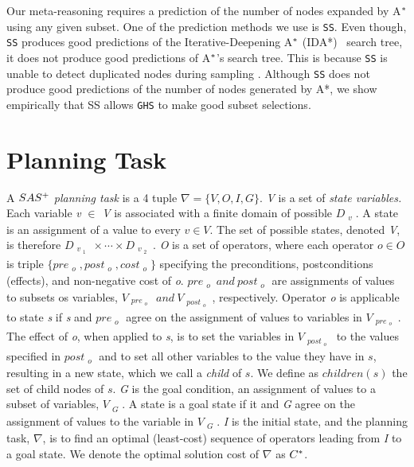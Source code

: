 Our meta-reasoning requires a prediction of the number of nodes expanded by A$\sp{*}$ using any given subset. One of the prediction methods we use is \texttt{SS}. Even though, \texttt{SS} produces good predictions of the Iterative-Deepening A$\sp{*}$ (IDA*)~\cite{Korf85ida} search tree, it does not produce good predictions of A$\sp{*}$'s search tree. This is because \texttt{SS} is unable to detect duplicated nodes during sampling \cite{lelis2014estimating}. Although \texttt{SS} does not produce good predictions of the number of nodes generated by A*, we show empirically that SS allows \texttt{GHS} to make good subset selections.

\section{Planning Task}

A $SAS\sp{+}$ \emph{planning task} \cite{backstrom1995complexity} is a 4 tuple $\nabla = \{V, O, I, G\}.$ \textit{V} is a set of \textit{state variables.} Each variable \textit{v} $\in$ \textit{V} is associated with a finite domain of possible $D_{\substack{v}}$. A state is an assignment of a value to every $v \in V.$ The set of possible states, denoted \textit{V}, is therefore $D_{\substack{v_{\substack{1}}}}    \times \cdots \times D_{\substack{v_{\substack{2}}}}$. \textit{O} is a set of operators, where each operator $o \in O$ is triple $\{pre_{\substack{o}} , post_{\substack{o}}, cost_{\substack{o}}\}$ specifying the preconditions, postconditions (effects), and non-negative cost of \textit{o}. $pre_{\substack{o}}\ and\ post_{\substack{o}}$ are assignments of values to subsets os variables, $V_{\substack{pre_{\substack{o}}}}\ and\ V_{\substack{post_{\substack{o}}}}$, respectively. Operator \textit{o} is applicable to state \textit{s} if \textit{s} and $pre_{\substack{o}}$ agree on the assignment of values to variables in $V_{\substack{pre_{\substack{o}}}}$. The effect of \textit{o}, when applied to \textit{s}, is to set the variables in $V_{\substack{post_{\substack{o}}}}$ to the values specified in $post_{\substack{o}}$ and to set all other variables to the value they have in $s$, resulting in a new state, which we call a \emph{child} of $s$. We define as $children(s)$ the set of child nodes of $s$. \textit{G} is the goal condition, an assignment of values to a subset of variables, $V_{\substack{G}}$. A state is a goal state if it and \textit{G} agree on the assignment of values to the variable in $V_{\substack{G}}$. \textit{I} is the initial state, and the planning task, $\nabla$, is to find an optimal (least-cost) sequence of operators leading from \textit{I} to a goal state. We denote the optimal solution cost of $\nabla$ as $C\sp{*}$. 

